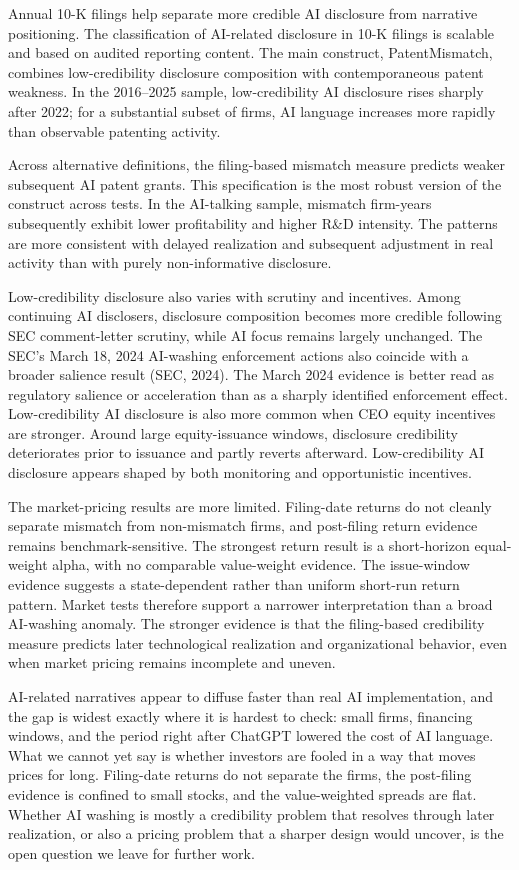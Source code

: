 Annual 10-K filings help separate more credible AI disclosure from narrative positioning. The classification of AI-related disclosure in 10-K filings is scalable and based on audited reporting content. The main construct, PatentMismatch, combines low-credibility disclosure composition with contemporaneous patent weakness. In the 2016--2025 sample, low-credibility AI disclosure rises sharply after 2022; for a substantial subset of firms, AI language increases more rapidly than observable patenting activity.

Across alternative definitions, the filing-based mismatch measure predicts weaker subsequent AI patent grants. This specification is the most robust version of the construct across tests. In the AI-talking sample, mismatch firm-years subsequently exhibit lower profitability and higher R\&D intensity. The patterns are more consistent with delayed realization and subsequent adjustment in real activity than with purely non-informative disclosure.

Low-credibility disclosure also varies with scrutiny and incentives. Among continuing AI disclosers, disclosure composition becomes more credible following SEC comment-letter scrutiny, while AI focus remains largely unchanged. The SEC's March 18, 2024 AI-washing enforcement actions also coincide with a broader salience result (SEC, 2024). The March 2024 evidence is better read as regulatory salience or acceleration than as a sharply identified enforcement effect. Low-credibility AI disclosure is also more common when CEO equity incentives are stronger. Around large equity-issuance windows, disclosure credibility deteriorates prior to issuance and partly reverts afterward. Low-credibility AI disclosure appears shaped by both monitoring and opportunistic incentives.

The market-pricing results are more limited. Filing-date returns do not cleanly separate mismatch from non-mismatch firms, and post-filing return evidence remains benchmark-sensitive. The strongest return result is a short-horizon equal-weight alpha, with no comparable value-weight evidence. The issue-window evidence suggests a state-dependent rather than uniform short-run return pattern. Market tests therefore support a narrower interpretation than a broad AI-washing anomaly. The stronger evidence is that the filing-based credibility measure predicts later technological realization and organizational behavior, even when market pricing remains incomplete and uneven.

AI-related narratives appear to diffuse faster than real AI implementation, and the gap is widest exactly where it is hardest to check: small firms, financing windows, and the period right after ChatGPT lowered the cost of AI language. What we cannot yet say is whether investors are fooled in a way that moves prices for long. Filing-date returns do not separate the firms, the post-filing evidence is confined to small stocks, and the value-weighted spreads are flat. Whether AI washing is mostly a credibility problem that resolves through later realization, or also a pricing problem that a sharper design would uncover, is the open question we leave for further work.

